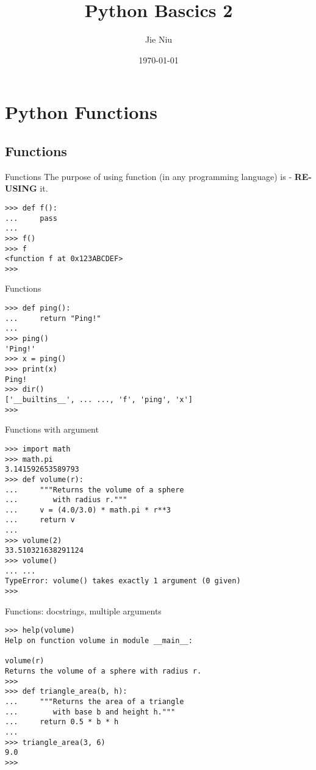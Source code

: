 \documentclass{beamer}
\title{Python Bascics 2}
\author{Jie Niu}
\institute{IGWES, JNU}
\date{\today}
\begin{document}
\begin{frame}
\titlepage
\end{frame}

\section{Python Functions}
\subsection{Functions}

\begin{frame}[fragile]{Functions}
The purpose of using function (in any programming language) is - \textbf{RE-USING} it.\\
\begin{verbatim}
>>> def f():
...     pass
...
>>> f()
>>> f
<function f at 0x123ABCDEF>
>>>
\end{verbatim}
\end{frame}

\begin{frame}[fragile]{Functions}
\begin{verbatim}
>>> def ping():
...     return "Ping!"
...
>>> ping()
'Ping!'
>>> x = ping()
>>> print(x)
Ping!
>>> dir()
['__builtins__', ... ..., 'f', 'ping', 'x']
>>>
\end{verbatim}
\end{frame}

\begin{frame}[fragile]{Functions with argument}
\begin{verbatim}
>>> import math
>>> math.pi
3.141592653589793
>>> def volume(r):
...     """Returns the volume of a sphere 
...        with radius r."""
...     v = (4.0/3.0) * math.pi * r**3
...     return v
...
>>> volume(2)
33.510321638291124
>>> volume()
... ...
TypeError: volume() takes exactly 1 argument (0 given)
>>>
\end{verbatim}
\end{frame}

\begin{frame}[fragile]{Functions: docstrings, multiple arguments}
\begin{verbatim}
>>> help(volume)
Help on function volume in module __main__:

volume(r)
Returns the volume of a sphere with radius r.
>>>
>>> def triangle_area(b, h):
...     """Returns the area of a triangle
...        with base b and height h."""
...     return 0.5 * b * h
...
>>> triangle_area(3, 6)
9.0
>>>
\end{verbatim}
\end{frame}
\end{document}

